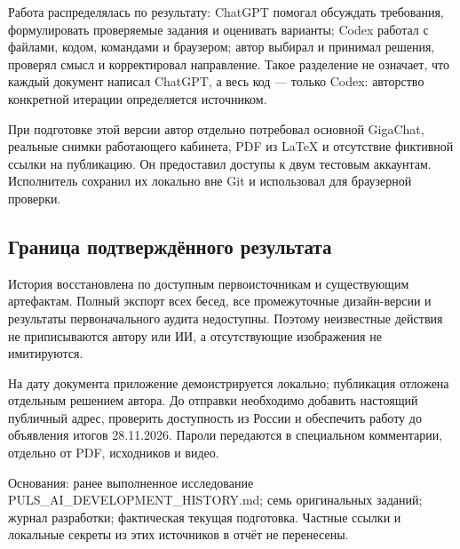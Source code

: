 \documentclass[11pt,a4paper]{article}
\newcommand{\source}[1]{{\small\color{muted}#1\par}}
\begin{document}
Работа распределялась по результату: ChatGPT помогал обсуждать требования, формулировать проверяемые задания и оценивать варианты; Codex работал с файлами, кодом, командами и браузером; автор выбирал и принимал решения, проверял смысл и корректировал направление. Такое разделение не означает, что каждый документ написал ChatGPT, а весь код — только Codex: авторство конкретной итерации определяется источником.

При подготовке этой версии автор отдельно потребовал основной GigaChat, реальные снимки работающего кабинета, PDF из LaTeX и отсутствие фиктивной ссылки на публикацию. Он предоставил доступы к двум тестовым аккаунтам. Исполнитель сохранил их локально вне Git и использовал для браузерной проверки.

\subsection{Граница подтверждённого результата}
История восстановлена по доступным первоисточникам и существующим артефактам. Полный экспорт всех бесед, все промежуточные дизайн-версии и результаты первоначального аудита недоступны. Поэтому неизвестные действия не приписываются автору или ИИ, а отсутствующие изображения не имитируются.

На дату документа приложение демонстрируется локально; публикация отложена отдельным решением автора. До отправки необходимо добавить настоящий публичный адрес, проверить доступность из России и обеспечить работу до объявления итогов 28.11.2026. Пароли передаются в специальном комментарии, отдельно от PDF, исходников и видео.
\source{Основания: ранее выполненное исследование PULS\_AI\_DEVELOPMENT\_HISTORY.md; семь оригинальных заданий; журнал разработки; фактическая текущая подготовка. Частные ссылки и локальные секреты из этих источников в отчёт не перенесены.}
\end{document}
